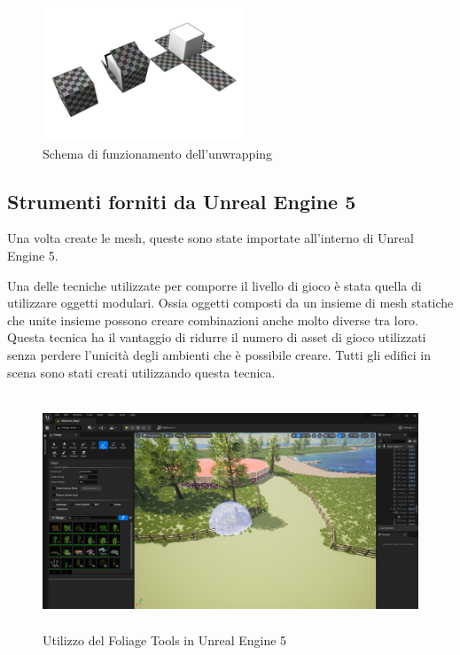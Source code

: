     \begin{figure}[!ht]
        \centering
        \includegraphics[width=6cm]{figure/UVUnwrapping.png}
        \caption{Schema di funzionamento dell'unwrapping }
    \end{figure}

    \subsection{Strumenti forniti da Unreal Engine 5}

    Una volta create le mesh, queste sono state importate all'interno di Unreal Engine 5.
    
    Una delle tecniche utilizzate per comporre il livello di gioco è stata quella di utilizzare oggetti modulari.
    Ossia oggetti composti da un insieme di mesh statiche che unite insieme possono creare combinazioni anche molto diverse tra loro.
    Questa tecnica ha il vantaggio di ridurre il numero di asset di gioco utilizzati senza perdere l'unicità degli ambienti che è possibile creare.
    Tutti gli edifici in scena sono stati creati utilizzando questa tecnica.
    
    \begin{figure}[t]
        \centering
        \includegraphics[height= 7cm]{figure/UnrealEngine5Editor.png}
        \caption{Utilizzo del Foliage Tools in Unreal Engine 5}
    \end{figure}


